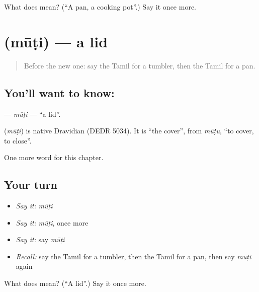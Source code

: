 \begin{tcolorbox}[breakable,colback=teal!4,colframe=teal!35!black,title={Before you move on}]
What does  mean? (\textquotedblleft{}A pan, a cooking pot\textquotedblright{}.) Say it once more.
\end{tcolorbox}
\section[\texorpdfstring{\ta{மூடி} (mūṭi)}{மூடி (mūṭi)}]{ (mūṭi) — a lid}

\label{lesson:TA-C182-muti}



\begin{quote}
Before the new one: say the Tamil for a tumbler, then the Tamil for a pan.
\end{quote}

\subsection*{You'll want to know: }
\textbf{} — \emph{mūṭi} — \textquotedblleft{}a lid\textquotedblright{}.

\begin{cousinweb}
\textbf{} (\emph{mūṭi}) is native Dravidian (DEDR 5034). It is \textquotedblleft{}the cover\textquotedblright{}, from \emph{mūṭu}, \textquotedblleft{}to cover, to close\textquotedblright{}.
\end{cousinweb}

\begin{grammarlens}[title={What you've built}]
One more word for this chapter.
\end{grammarlens}

\subsection*{Your turn}
\begin{itemize}
\raggedright
  \item \emph{Say it:} \emph{mūṭi}
  \item \emph{Say it:} \emph{mūṭi}, once more
  \item \emph{Say it:} say \emph{mūṭi}
  \item \emph{Recall:} say the Tamil for a tumbler, then the Tamil for a pan, then say \emph{mūṭi} again
\end{itemize}

\begin{tcolorbox}[breakable,colback=teal!4,colframe=teal!35!black,title={Before you move on}]
What does  mean? (\textquotedblleft{}A lid\textquotedblright{}.) Say it once more.
\end{tcolorbox}
